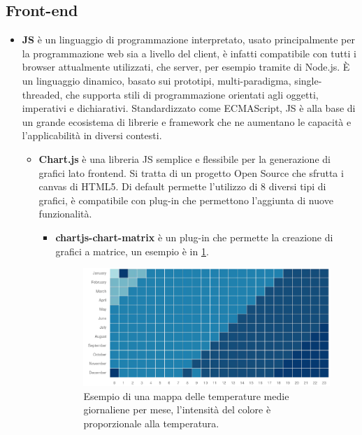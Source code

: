 \documentclass[12pt,a4paper,openright,twoside, openany]{book}
\begin{document}
\subsection{Front-end}
\begin{itemize}[noitemsep]
    \item \textbf{\ac{JS}} è un linguaggio di programmazione interpretato, usato principalmente per la programmazione web sia a livello del client, è infatti compatibile con tutti i browser attualmente utilizzati, che server, per esempio tramite di Node.js. È un linguaggio dinamico, basato sui prototipi, multi-paradigma, single-threaded, che supporta stili di programmazione orientati agli oggetti, imperativi e dichiarativi. Standardizzato come ECMAScript, \ac{JS} è alla base di un grande ecosistema di librerie e framework che ne aumentano le capacità e l'applicabilità in diversi contesti.
    \begin{itemize}[noitemsep]
        \item \textbf{Chart.js} è una libreria \ac{JS} semplice e flessibile per la generazione di grafici lato frontend. Si tratta di un progetto Open Source che sfrutta i canvas di HTML5. Di default permette l'utilizzo di 8 diversi tipi di grafici, è compatibile con plug-in che permettono l'aggiunta di nuove funzionalità.
        \begin{itemize}[noitemsep]
            \item \textbf{chartjs-chart-matrix} è un plug-in che permette la creazione di grafici a matrice, un esempio è in \cref{fig.matrix_chart_example}.
            \begin{figure}
                \centering
                \includegraphics[width=0.9\linewidth]{./figures/matrix-chart-example.png}
                \caption{Esempio di una mappa delle temperature medie giornaliene per mese, l'intensità del colore è proporzionale alla temperatura.}
                \label{fig.matrix_chart_example}
            \end{figure}

\end{itemize}
\end{itemize}
\end{itemize}
\end{document}
